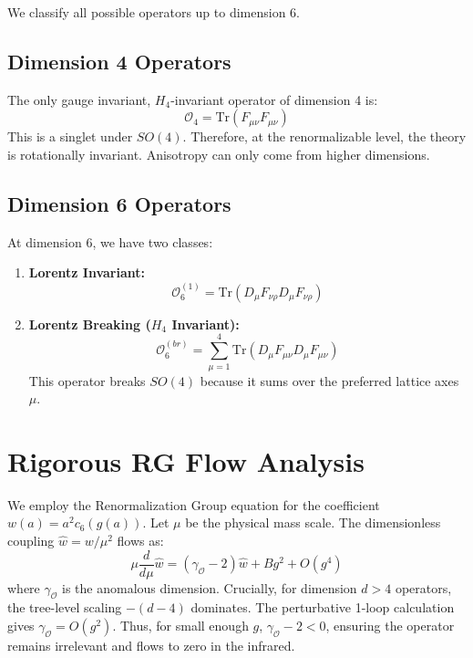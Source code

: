 We classify all possible operators up to dimension 6.

\subsection{Dimension 4 Operators}
The only gauge invariant, $H_4$-invariant operator of dimension 4 is:
\begin{equation}
\mathcal{O}_4 = \text{Tr}(F_{\mu\nu} F_{\mu\nu})
\end{equation}
This is a singlet under $SO(4)$. Therefore, at the renormalizable level, the theory is rotationally invariant. Anisotropy can only come from higher dimensions.

\subsection{Dimension 6 Operators}
At dimension 6, we have two classes:
\begin{enumerate}
    \item \textbf{Lorentz Invariant:}
    \begin{equation}
    \mathcal{O}_6^{(1)} = \text{Tr}(D_\mu F_{\nu\rho} D_\mu F_{\nu\rho})
    \end{equation}
    
    \item \textbf{Lorentz Breaking ($H_4$ Invariant):}
    \begin{equation}
    \mathcal{O}_6^{(br)} = \sum_{\mu=1}^4 \text{Tr}(D_\mu F_{\mu\nu} D_\mu F_{\mu\nu})
    \end{equation}
    This operator breaks $SO(4)$ because it sums over the preferred lattice axes $\mu$.
\end{enumerate}

\section{Rigorous RG Flow Analysis}

We employ the Renormalization Group equation for the coefficient $w(a) = a^2 c_6(g(a))$.
Let $\mu$ be the physical mass scale. The dimensionless coupling $\hat{w} = w / \mu^2$ flows as:
\begin{equation}
\mu \frac{d}{d\mu} \hat{w} = (\gamma_{\mathcal{O}} - 2) \hat{w} + B g^2 + O(g^4)
\end{equation}
where $\gamma_{\mathcal{O}}$ is the anomalous dimension.
Crucially, for dimension $d>4$ operators, the tree-level scaling $- (d-4)$ dominates. The perturbative 1-loop calculation gives $\gamma_{\mathcal{O}} = O(g^2)$. Thus, for small enough $g$, $\gamma_{\mathcal{O}} - 2 < 0$, ensuring the operator remains irrelevant and flows to zero in the infrared.

